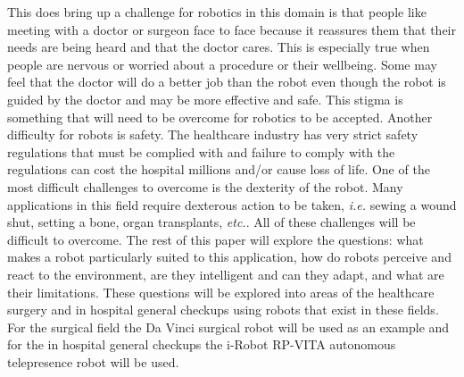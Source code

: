 \documentclass[11pt,conference]{IEEEtran}
\begin{document}
\newline
This does bring up a challenge for robotics in this domain is that people like meeting with a doctor or surgeon face to face because it reassures them that their needs are being heard and that the doctor cares.  This is especially true when people are nervous or worried about a procedure or their wellbeing.  Some may feel that the doctor will do a better job than the robot even though the robot is guided by the doctor and may be more effective and safe.  This stigma is something that will need to be overcome for robotics to be accepted.  Another difficulty for robots is safety.  The healthcare industry has very strict safety regulations that must be complied with and failure to comply with the regulations can cost the hospital millions and/or cause loss of life. One of the most difficult challenges to overcome is the dexterity of the robot.  Many applications in this field require dexterous action to be taken, \textit{i.e.} sewing a wound shut, setting a bone, organ transplants, \textit{etc.}.  All of these challenges will be difficult to overcome. 
\newline
The rest of this paper will explore the questions: what makes a robot particularly suited to this application, how do robots perceive and react to the environment,  are they intelligent and can they adapt, and what are their limitations.  These questions will be explored into areas of the healthcare surgery and in hospital general checkups using robots that exist in these fields.  For the surgical field the Da Vinci surgical robot will be used as an example and for the in hospital general checkups the i-Robot RP-VITA autonomous telepresence robot will be used. 
\end{document}
